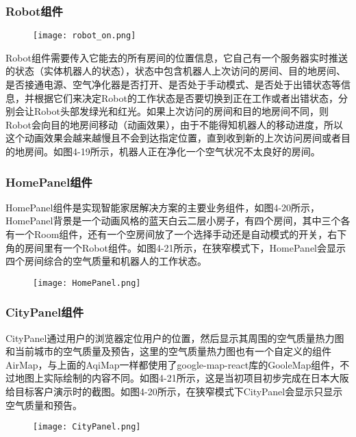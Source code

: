 \subsubsection{Robot组件}
\begin{figure}[!htp]
 \centering
 \texttt{[image: robot\_on.png]}
\end{figure}
Robot组件需要传入它能去的所有房间的位置信息，它自己有一个服务器实时推送的状态（实体机器人的状态），状态中包含机器人上次访问的房间、目的地房间、是否接通电源、空气净化器是否打开、是否处于手动模式、是否处于出错状态等信息，并根据它们来决定Robot的工作状态是否要切换到正在工作或者出错状态，分别会让Robot头部发绿光和红光。如果上次访问的房间和目的地房间不同，则Robot会向目的地房间移动（动画效果），由于不能得知机器人的移动进度，所以这个动画效果会越来越慢且不会到达指定位置，直到收到新的上次访问房间或者目的地房间。如图4-19所示，机器人正在净化一个空气状况不太良好的房间。
\subsubsection{HomePanel组件}
HomePanel组件是实现智能家居解决方案的主要业务组件，如图4-20所示，HomePanel背景是一个动画风格的蓝天白云二层小房子，有四个房间，其中三个各有一个Room组件，还有一个空房间放了一个选择手动还是自动模式的开关，右下角的房间里有一个Robot组件。如图4-21所示，在狭窄模式下，HomePanel会显示四个房间综合的空气质量和机器人的工作状态。
\begin{figure}[!htp]
 \centering
 \texttt{[image: HomePanel.png]}
\end{figure}
\subsubsection{CityPanel组件}
CityPanel通过用户的浏览器定位用户的位置，然后显示其周围的空气质量热力图和当前城市的空气质量及预告，这里的空气质量热力图也有一个自定义的组件AirMap，与上面的AqiMap一样都使用了google-map-react库的GooleMap组件，不过地图上实际绘制的内容不同。如图4-21所示，这是当初项目初步完成在日本大阪给目标客户演示时的截图。如图4-20所示，在狭窄模式下CityPanel会显示只显示空气质量和预告。
\begin{figure}[!htp]
 \centering
 \texttt{[image: CityPanel.png]}
\end{figure} 
